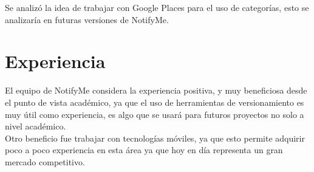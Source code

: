 \documentclass[a4paper,11pt]{article}
\begin{document}
Se analizó la idea de trabajar con Google Places para el uso de categorías, esto se analizaría en futuras versiones de NotifyMe.

\section{Experiencia}
El equipo de NotifyMe considera la experiencia positiva, y muy beneficiosa desde el punto de vista académico, ya que el uso de herramientas de versionamiento es muy útil como experiencia, es algo que se usará para futuros proyectos no solo a nivel académico. \\

Otro beneficio fue trabajar con tecnologías móviles, ya que esto permite adquirir poco a poco experiencia en esta área ya que hoy en día representa un gran mercado competitivo.
\end{document}
